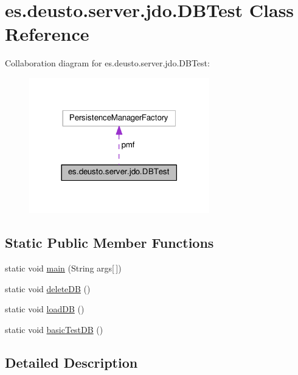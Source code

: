 \hypertarget{classes_1_1deusto_1_1server_1_1jdo_1_1_d_b_test}{}\section{es.\+deusto.\+server.\+jdo.\+D\+B\+Test Class Reference}
\label{classes_1_1deusto_1_1server_1_1jdo_1_1_d_b_test}


Collaboration diagram for es.\+deusto.\+server.\+jdo.\+D\+B\+Test\+:\nopagebreak
\begin{figure}[H]
\begin{center}
\leavevmode
\includegraphics[width=222pt]{classes_1_1deusto_1_1server_1_1jdo_1_1_d_b_test__coll__graph}
\end{center}
\end{figure}
\subsection*{Static Public Member Functions}
\begin{DoxyCompactItemize}
\item 
static void \hyperlink{classes_1_1deusto_1_1server_1_1jdo_1_1_d_b_test_afd0180d9045ac006d8cbd145b9935c65}{main} (String args\mbox{[}$\,$\mbox{]})
\item 
static void \hyperlink{classes_1_1deusto_1_1server_1_1jdo_1_1_d_b_test_ae17f24746187cab1256b32c2b0ea1341}{delete\+DB} ()
\item 
static void \hyperlink{classes_1_1deusto_1_1server_1_1jdo_1_1_d_b_test_a8430b487bdfdf20d5f0e26517b7de1cc}{load\+DB} ()
\item 
static void \hyperlink{classes_1_1deusto_1_1server_1_1jdo_1_1_d_b_test_add160552e53376d7375c807043934688}{basic\+Test\+DB} ()
\end{DoxyCompactItemize}


\subsection{Detailed Description}


